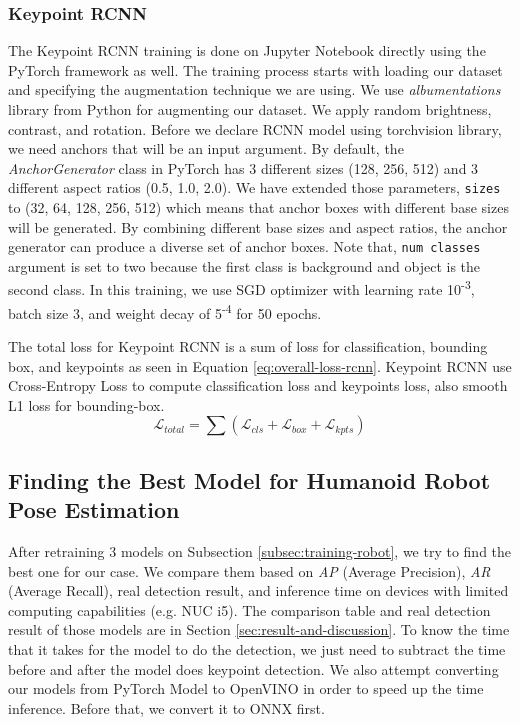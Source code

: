 \subsubsection{Keypoint RCNN}
\label{subsubsec:training-rcnn}

The Keypoint RCNN training is done on Jupyter Notebook directly using the PyTorch framework as well.
The training process starts with loading our dataset and specifying the augmentation technique we are using. We use \emph{albumentations} library from Python for augmenting our dataset.
We apply random brightness, contrast, and rotation.
Before we declare RCNN model using torchvision library, we need anchors that will be an input argument. 
By default, the \emph{AnchorGenerator} class in PyTorch has 3 different sizes (128, 256, 512) and 3 different aspect ratios (0.5, 1.0, 2.0).
We have extended those parameters, \verb|sizes| to (32, 64, 128, 256, 512) which means that anchor boxes with different base sizes will be generated.
By combining different base sizes and aspect ratios, the anchor generator can produce a diverse set of anchor boxes.
Note that, \verb|num classes| argument is set to two because the first class is background and object is the second class.
In this training, we use SGD optimizer with learning rate 10\textsuperscript{-3}, batch size 3, and weight decay of 5\textsuperscript{-4} for 50 epochs.

The total loss for Keypoint RCNN is a sum of loss for classification, bounding box, and keypoints as seen in Equation \ref{eq:overall-loss-rcnn}.
Keypoint RCNN use Cross-Entropy Loss to compute classification loss and keypoints loss, also smooth L1 loss for bounding-box. 
\begin{equation}
  \label{eq:overall-loss-rcnn}
  \mathcal{L}_{total} = \sum (\mathcal{L}_{cls} + \mathcal{L}_{box} + \mathcal{L}_{kpts})
\end{equation}

\subsection{Finding the Best Model for Humanoid Robot Pose Estimation}
\label{subsec:finding-best-model-humanoid-robot}

After retraining 3 models on Subsection \ref{subsec:training-robot}, we try to find the best one for our case. We compare them based on \emph{AP} (Average Precision), \emph{AR} (Average Recall),
real detection result, and inference time on devices with limited computing capabilities (e.g. NUC i5).
The comparison table and real detection result of those models are in Section \ref{sec:result-and-discussion}.
To know the time that it takes for the model to do the detection, we just need to subtract the time before and after the model does keypoint detection.
We also attempt converting our models from PyTorch Model to OpenVINO in order to speed up the time inference. Before that, we convert it to ONNX first.

